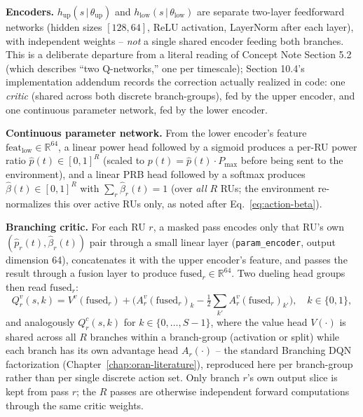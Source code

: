 \textbf{Encoders.} $h_{\mathrm{up}}(s\,|\,\theta_{\mathrm{up}})$ and
$h_{\mathrm{low}}(s\,|\,\theta_{\mathrm{low}})$ are separate two-layer
feedforward networks (hidden sizes $[128, 64]$, ReLU activation, LayerNorm
after each layer), with independent weights -- \emph{not} a single shared
encoder feeding both branches. This is a deliberate departure from a
literal reading of Concept Note Section 5.2 (which describes ``two
Q-networks,'' one per timescale); Section 10.4's implementation addendum
records the correction actually realized in code: one \emph{critic}
(shared across both discrete branch-groups), fed by the upper encoder, and
one continuous parameter network, fed by the lower encoder.

\textbf{Continuous parameter network.} From the lower encoder's feature
$\mathrm{feat}_{\mathrm{low}} \in \mathbb{R}^{64}$, a linear power head
followed by a sigmoid produces a per-RU power ratio
$\hat{p}(t) \in [0,1]^R$ (scaled to $p(t) = \hat{p}(t) \cdot P_{\max}$
before being sent to the environment), and a linear PRB head followed by a
softmax produces $\hat\beta(t) \in [0,1]^R$ with $\sum_r \hat\beta_r(t)=1$
(over \emph{all} $R$ RUs; the environment re-normalizes this over active
RUs only, as noted after Eq.~\ref{eq:action-beta}).

\textbf{Branching critic.} For each RU $r$, a masked pass encodes only
that RU's own $(\hat{p}_r(t), \hat\beta_r(t))$ pair through a small linear
layer (\texttt{param\_encoder}, output dimension 64), concatenates it with
the upper encoder's feature, and passes the result through a fusion layer
to produce $\mathrm{fused}_r \in \mathbb{R}^{64}$. Two dueling head groups
then read $\mathrm{fused}_r$:
\begin{equation}
  Q_r^{v}(s, k) = V^{v}(\mathrm{fused}_r) + \Big(A_r^{v}(\mathrm{fused}_r)_k - \tfrac{1}{2}\textstyle\sum_{k'} A_r^{v}(\mathrm{fused}_r)_{k'}\Big),\quad k \in \{0,1\},
  \label{eq:oran-dueling-act}
\end{equation}
and analogously $Q_r^{c}(s, k)$ for $k \in \{0,\dots,S-1\}$, where the
value head $V(\cdot)$ is shared across all $R$ branches within a
branch-group (activation or split) while each branch has its own advantage
head $A_r(\cdot)$ -- the standard Branching DQN factorization
(Chapter~\ref{chap:oran-literature}), reproduced here per branch-group
rather than per single discrete action set. Only branch $r$'s own output
slice is kept from pass $r$; the $R$ passes are otherwise independent
forward computations through the same critic weights.

